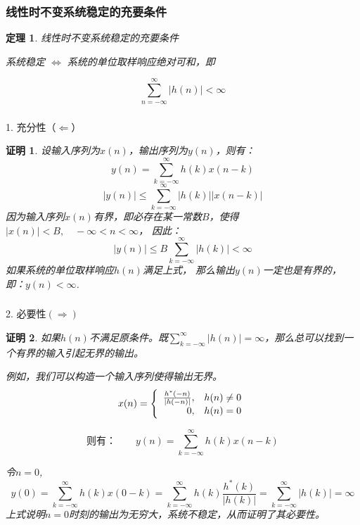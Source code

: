 \documentclass[notheorems,compress,mathserif,table]{beamer}
\newtheorem{theorem}{定理}
\newtheorem{daproof}{证明}
\begin{document}
\begin{frame}[shrink]\frametitle{线性时不变系统稳定的充要条件}%
\begin{theorem}
   线性时不变系统稳定的充要条件%
        \begin{center}
        系统稳定  $\Longleftrightarrow$ 系统的单位取样响应绝对可和，即
        \end{center}%
        \begin{equation*}        \sum_{n=-\infty}^{\infty}|h(n)|<\infty
        \end{equation*}%
   \end{theorem}



\end{frame}

\begin{frame}[shrink]\frametitle{}%

1. 充分性（$\Longleftarrow$）
\begin{daproof}
设输入序列为$x(n)$，输出序列为$y(n)$，则有：
            $$y(n) = \sum_{k=-\infty}^{\infty}h(k)x(n-k)$$
            $$|y(n)| \leq \sum_{k=-\infty}^{\infty}|h(k)||x(n-k)|$$
            因为输入序列$x(n)$有界，即必存在某一常数$B$，使得
            $|x(n)|<B,\quad -\infty<n<\infty$，
            因此：
            $$|y(n)| \leq B\sum_{k=-\infty}^{\infty}|h(k)| <\infty$$
            如果系统的单位取样响应$h(n)$满足上式，
            那么输出$y(n)$一定也是有界的，即：$y(n)<\infty$.
\end{daproof}
\end{frame}

\begin{frame}[shrink]\frametitle{}%
2. 必要性$(\Longrightarrow)$
\begin{daproof}
   如果$h(n)$不满足原条件。既$\sum_{k=-\infty}^{\infty}|h(n)|=\infty$，那么总可以找到一个有界的输入引起无界的输出。

   例如，我们可以构造一个输入序列使得输出无界。
            \begin{equation*}
                 x(n)= \left\{\begin{array}
                 {r@{,\quad}l}
                 \frac{h^{*}(-n)}{|h(-n)|}&\mbox{$h(n)\neq0$}\\0&\mbox{$h(n)=0$}
                \end{array} \right.
            \end{equation*}

            $$\mbox{则有：}\qquad y(n) = \sum_{k=-\infty}^{\infty}h(k)x(n-k)$$

            令$n=0$,
            $$y(0) = \sum_{k=-\infty}^{\infty}h(k)x(0-k) = \sum_{k=-\infty}^{\infty}h(k)\frac{h^{*}(k)}{|h(k)|} = \sum_{k=-\infty}^{\infty}|h(k)| = \infty$$
            上式说明$n=0$时刻的输出为无穷大，系统不稳定，从而证明了其必要性。
\end{daproof}
\end{frame}
\end{document}
